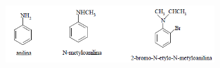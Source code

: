 \begin{itemize}
\begin{enumerate}
        \begin{figure}[H]
            \centering
            \includegraphics[width=0.7\textwidth]{img/anilina}
            \label{fig.anilina}
        \end{figure}
    \end{enumerate}
    

\end{itemize}
